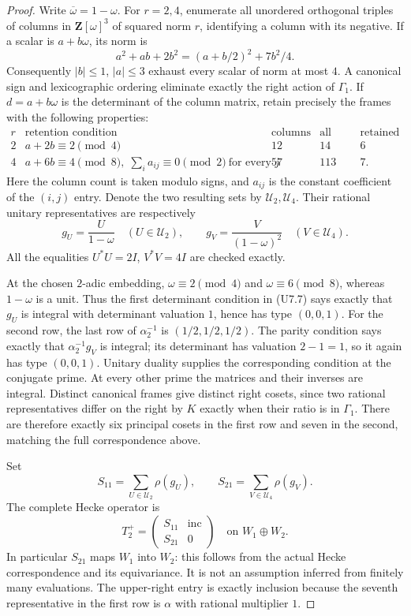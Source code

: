 \documentclass[11pt,a4paper]{article}
\theoremstyle{definition}
\begin{document}
\begin{proof}
Write $\overline\omega=1-\omega$. For $r=2,4$, enumerate all
unordered orthogonal triples of columns in $\mathbf Z[\omega]^3$
of squared norm $r$, identifying a column with its negative. If a
scalar is $a+b\omega$, its norm is
\[
 a^2+ab+2b^2=(a+b/2)^2+7b^2/4.
 \tag{U7.6}
\]
Consequently $|b|\le1$, $|a|\le3$ exhaust every scalar of norm at
most $4$. A canonical sign and lexicographic ordering eliminate
exactly the right action of $\Gamma_1$. If $d=a+b\omega$ is the
determinant of the column matrix, retain precisely the frames with
the following properties:
\[
 \begin{array}{c|l|r|r|r}
 r&\text{retention condition}&\text{columns}
                &\text{all frames}&\text{retained}\\ \hline
 2&a+2b\equiv2\pmod4&12&14&6\\
 4&a+6b\equiv4\pmod8,
       \;\sum_i a_{ij}\equiv0\pmod2\ \text{for every }j
       &57&113&7.
 \end{array}
 \tag{U7.7}
\]
Here the column count is taken modulo signs, and $a_{ij}$ is the
constant coefficient of the $(i,j)$ entry.
Denote the two resulting sets by $\mathcal U_2,\mathcal U_4$.
Their rational unitary representatives are respectively
\[
 g_U=\frac{U}{1-\omega}\quad(U\in\mathcal U_2),
 \qquad
 g_V=\frac{V}{(1-\omega)^2}\quad(V\in\mathcal U_4).
 \tag{U7.8}
\]
All the equalities $U^*U=2I$, $V^*V=4I$ are checked exactly.

At the chosen $2$-adic embedding, $\omega\equiv2\pmod4$ and
$\omega\equiv6\pmod8$, whereas $1-\omega$ is a unit. Thus the
first determinant condition in (U7.7) says exactly that $g_U$ is
integral with determinant valuation $1$, hence has type $(0,0,1)$.
For the second row, the last row of $\alpha_2^{-1}$ is
$(1/2,1/2,1/2)$. The parity condition says exactly that
$\alpha_2^{-1}g_V$ is integral; its determinant has valuation
$2-1=1$, so it again has type $(0,0,1)$. Unitary duality supplies
the corresponding condition at the conjugate prime. At every
other prime the matrices and their inverses are integral.
Distinct canonical frames give distinct right cosets, since two
rational representatives differ on the right by $K$ exactly when
their ratio is in $\Gamma_1$. There are therefore exactly six
principal cosets in the first row and seven in the second, matching
the full correspondence above.

Set
\[
 S_{11}=\sum_{U\in\mathcal U_2}\rho(g_U),
 \qquad S_{21}=\sum_{V\in\mathcal U_4}\rho(g_V).
\]
The complete Hecke operator is
\[
 T_2^+=\begin{pmatrix}S_{11}&\operatorname{inc}\\
                           S_{21}&0\end{pmatrix}
       \quad\text{on }W_1\oplus W_2.
 \tag{U7.9}
\]
In particular $S_{21}$ maps $W_1$ into $W_2$: this follows from the
actual Hecke correspondence and its equivariance. It is not an
assumption inferred from finitely many evaluations. The upper-right
entry is exactly inclusion because the seventh representative in
the first row is $\alpha$ with rational multiplier $1$.


\end{proof}
\end{document}
